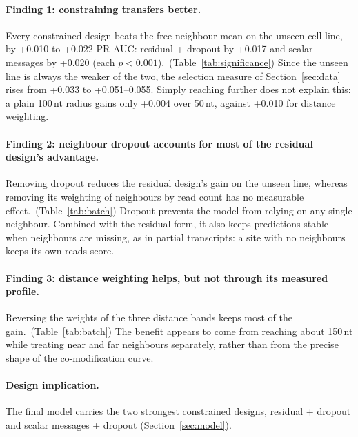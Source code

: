 \documentclass[11pt,a4paper]{article}
\begin{document}
\paragraph{Finding 1: constraining transfers better.}
Every constrained design beats the free neighbour mean on the unseen cell line, by +0.010 to +0.022 PR AUC: residual + dropout by +0.017 and scalar messages by +0.020 (each $p<0.001$).~(Table~\ref{tab:significance}) Since the unseen line is always the weaker of the two, the selection measure of Section~\ref{sec:data} rises from +0.033 to +0.051--0.055. Simply reaching further does not explain this: a plain 100\,nt radius gains only +0.004 over 50\,nt, against +0.010 for distance weighting.

\paragraph{Finding 2: neighbour dropout accounts for most of the residual design's advantage.}
Removing dropout reduces the residual design's gain on the unseen line, whereas removing its weighting of neighbours by read count has no measurable effect.~(Table~\ref{tab:batch}) Dropout prevents the model from relying on any single neighbour. Combined with the residual form, it also keeps predictions stable when neighbours are missing, as in partial transcripts: a site with no neighbours keeps its own-reads score.

\paragraph{Finding 3: distance weighting helps, but not through its measured profile.}
Reversing the weights of the three distance bands keeps most of the gain.~(Table~\ref{tab:batch}) The benefit appears to come from reaching about 150\,nt while treating near and far neighbours separately, rather than from the precise shape of the co-modification curve.

\paragraph{Design implication.}
The final model carries the two strongest constrained designs, residual + dropout and scalar messages + dropout (Section~\ref{sec:model}).
\end{document}

